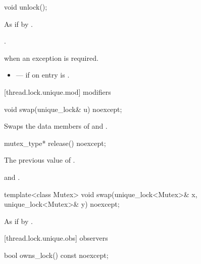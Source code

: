 %
\begin{itemdecl}
void unlock();
\end{itemdecl}

\begin{itemdescr}
\pnum\effects As if by .

\pnum\postconditions {}.

\pnum\throws {} when
an exception is required.

\pnum \errors
\begin{itemize}
\item {} --- if on entry  is .
\end{itemize}
\end{itemdescr}

[thread.lock.unique.mod]{ modifiers}

%
\begin{itemdecl}
void swap(unique_lock& u) noexcept;
\end{itemdecl}

\begin{itemdescr}
\pnum\effects Swaps the data members of  and .
\end{itemdescr}

%
\begin{itemdecl}
mutex_type* release() noexcept;
\end{itemdecl}

\begin{itemdescr}
\pnum\returns The previous value of .

\pnum\postconditions {} and .
\end{itemdescr}

%
\begin{itemdecl}
template<class Mutex>
  void swap(unique_lock<Mutex>& x, unique_lock<Mutex>& y) noexcept;
\end{itemdecl}

\begin{itemdescr}
\pnum\effects As if by .
\end{itemdescr}

[thread.lock.unique.obs]{ observers}

%
\begin{itemdecl}
bool owns_lock() const noexcept;
\end{itemdecl}

